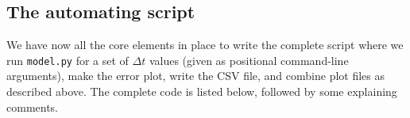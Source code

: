 \documentclass[graybox,sectrefs,envcountresetchap,open=right,final]{svmonodo}
\begin{document}
\subsection{The automating script}

We have now all the core elements in place to write the complete
script where we run
\texttt{model.py} for a set of $\Delta t$ values (given as positional
command-line arguments), make the error plot,
write the CSV file, and combine plot files as described above.
The complete code is listed below, followed by some explaining comments.
\end{document}
